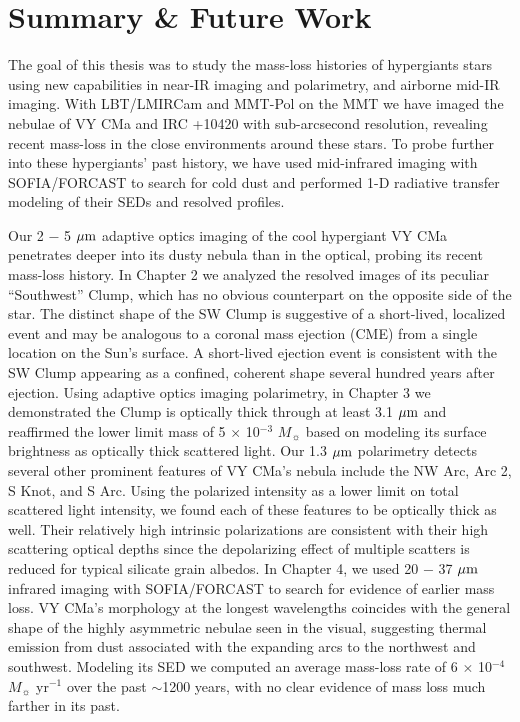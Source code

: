 \chapter{Summary \& Future Work}
\label{chap:summary}

The goal of this thesis was to study the mass-loss histories of hypergiants stars using new capabilities in near-IR imaging and polarimetry, and airborne mid-IR imaging.  With LBT/LMIRCam and MMT-Pol on the MMT we have imaged the nebulae of VY CMa and IRC +10420 with sub-arcsecond resolution, revealing recent mass-loss in the close environments around these stars.  To probe further into these hypergiants' past history, we have used mid-infrared imaging with SOFIA/FORCAST to search for cold dust and performed 1-D radiative transfer modeling of their SEDs and resolved profiles.

Our 2 $-$ 5 $\mbox{$\mu$m}$ adaptive optics imaging of the cool hypergiant VY CMa penetrates deeper into its dusty nebula than in the optical, probing its recent mass-loss history.  In Chapter 2 we analyzed the resolved images of its peculiar ``Southwest'' Clump, which has no obvious counterpart on the opposite side of the star.   The distinct shape of the SW Clump is suggestive of a short-lived, localized event and may be analogous to a coronal mass ejection (CME) from a single location on the Sun's surface.  A short-lived ejection event is consistent with the SW Clump appearing as a confined, coherent shape several hundred years after ejection.  Using adaptive optics imaging polarimetry, in Chapter 3 we demonstrated the Clump is optically thick through at least 3.1 $\mbox{$\mu$m}$ and reaffirmed the lower limit mass of 5 $\times$ 10$^{-3}$ $M_{\sun}$ based on modeling its surface brightness as optically thick scattered light.  Our 1.3 $\mbox{$\mu$m}$ polarimetry detects several other prominent features of VY CMa's nebula include the NW Arc, Arc 2, S Knot, and S Arc.  Using the polarized intensity as a lower limit on total scattered light intensity, we found each of these features to be optically thick as well.  Their relatively high intrinsic polarizations are consistent with their high scattering optical depths since the depolarizing effect of multiple scatters is reduced for typical silicate grain albedos.  In Chapter 4, we used 20 $-$ 37 $
\mbox{$\mu$m}$ infrared imaging with SOFIA/FORCAST to search for evidence of earlier mass loss.  VY CMa's morphology at the longest wavelengths coincides with the general shape of the highly asymmetric nebulae seen in the visual, suggesting thermal emission from dust associated with the expanding arcs to the northwest and southwest.  Modeling its SED we computed an average mass-loss rate of 6 $\times$ 10$^{-4}$ $M_{\sun}$ yr$^{-1}$ over the past $\sim$1200 years, with no clear evidence of mass loss much farther in its past.


